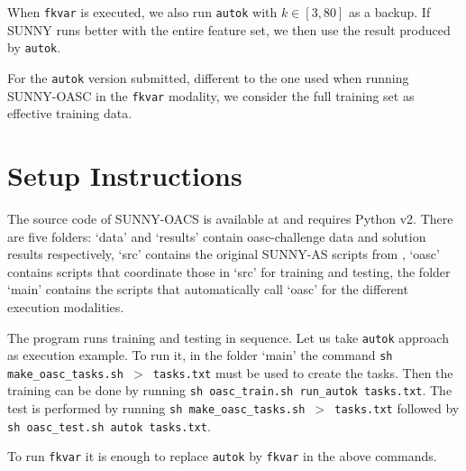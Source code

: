 \documentclass[tablecaption=bottom,wcp]{jmlr} %
\begin{document}
When \texttt{fkvar} is executed, we also run 
\texttt{autok} with $k \in [3,80]$ as a backup. If SUNNY runs better with the 
entire feature set, we then use the result produced by \texttt{autok}.

For the \texttt{autok} version submitted, different to the one used when 
running SUNNY-OASC in the \texttt{fkvar} modality, we consider the 
full training set as effective training data. 

\section{Setup Instructions}

The source code of SUNNY-OACS is available at \cite{sunnyoasc} and requires 
Python v2. There are five folders: `data' and `results' contain oasc-challenge 
data and solution results respectively, `src' contains the original SUNNY-AS 
scripts from \cite{sunnyas}, `oasc' contains scripts that coordinate those in 
`src' for training and testing, the folder `main' contains the scripts that 
automatically call `oasc' for the different execution modalities. 

The program runs training and testing in sequence. Let us take \texttt{autok} 
approach as execution example. To run it, in the folder `main' the 
command \texttt{sh make\_oasc\_tasks.sh $>$ tasks.txt} must be used to create 
the tasks. Then the training can be done by running \texttt{sh oasc\_train.sh 
run\_autok tasks.txt}. The test is performed by running \texttt{sh 
make\_oasc\_tasks.sh $>$ tasks.txt} followed by \texttt{sh oasc\_test.sh autok 
tasks.txt}.

To run \texttt{fkvar} it is enough to replace 
 \texttt{autok} by \texttt{fkvar} in the above commands. 



\end{document}
